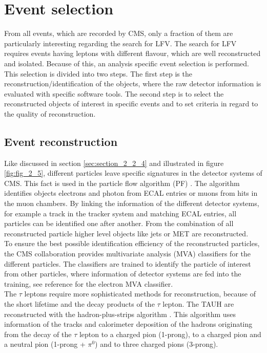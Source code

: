 \section{Event selection}
\label{sec:section_3_2}

From all events, which are recorded by \gls{CMS}, only a fraction of them are particularly interesting regarding the search for \gls{LFV}. The search for \gls{LFV} requires events having leptons with different flavour, which are well reconstructed and isolated. Because of this, an analysis specific event selection is performed. This selection is divided into two steps. The first step is the reconstruction/identification of the objects, where the raw detector information is evaluated with specific software tools. The second step is to select the reconstructed objects of interest in specific events and to set criteria in regard to the quality of reconstruction. 


\subsection{Event reconstruction}
\label{sec:section_3_2_1}

Like discussed in section \ref{sec:section_2_2_4} and illustrated in figure \ref{fig:fig_2_5}, different particles leave specific signatures in the detector systems of \gls{CMS}. This fact is used in the particle flow algorithm (\gls{PF}) \cite{PF}. The algorithm identifies objects electrons and photon from \gls{ECAL} entries or muons from hits in the muon chambers. By linking the information of the different detector systems, for example a track in the tracker system and matching \gls{ECAL} entries, all particles can be identified one after another.  From the combination of all reconstructed particle higher level objects like jets or \gls{MET} are reconstructed. \\

To ensure the best possible identification efficiency of the reconstructed particles, the \gls{CMS} collaboration provides multivariate analysis (\gls{MVA}) classifiers for the different particles. The classifiers are trained to identify the particle of interest from other particles, where information of detector systems are fed into the training, see reference \cite{ERECO} for the electron \gls{MVA} classifier. \\

The $\tau$ leptons require more sophisticated methods for reconstruction, because of the short lifetime and the decay products of the $\tau$ lepton. The \gls{TAUH} are reconstructed with the hadron-plus-strips algorithm \cite{TAURECO}. This algorithm uses information of the tracks and calorimeter deposition of the hadrons originating from the decay of the $\tau$ lepton to a charged pion (1-prong), to a charged pion and a neutral pion (1-prong + $\pi^0$) and to three charged pions (3-prong). \\

